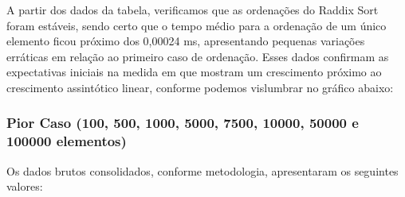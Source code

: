 \documentclass[a4paper, 12pt]{article}
\begin{document}
A partir dos dados da tabela, verificamos que as ordenações do Raddix Sort foram estáveis, sendo certo que o tempo médio para a ordenação de um único elemento ficou próximo dos 0,00024 ms, apresentando pequenas variações erráticas em relação ao primeiro caso de ordenação. Esses dados confirmam as expectativas iniciais na medida em que mostram um crescimento próximo ao crescimento assintótico linear, conforme podemos vislumbrar no gráfico abaixo:
\vspace{0.3cm}
\begin{center}
\end{center}

\subsubsection{Pior Caso (100, 500, 1000, 5000, 7500, 10000, 50000 e 100000 elementos)}

\tab{ }Os dados brutos consolidados, conforme metodologia, apresentaram os seguintes valores:
\vspace{0.3cm}
\end{document}
